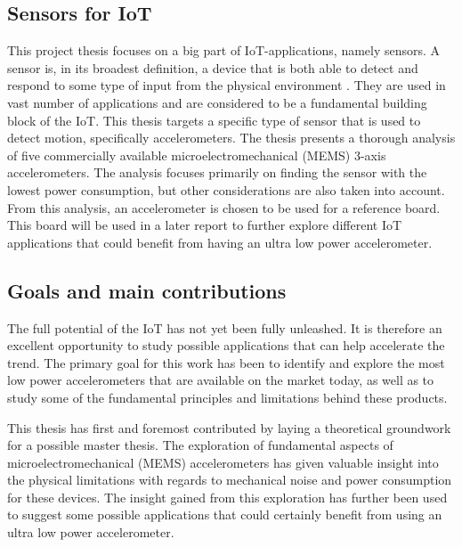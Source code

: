 \subsection{Sensors for IoT}

This project thesis focuses on a big part of IoT-applications, namely sensors. A sensor is, in its broadest definition, a device that is both able to detect and respond to some type of input from the physical environment \cite{wigmore12}. They are used in vast number of applications and are considered to be a fundamental building block of the IoT. This thesis targets a specific type of sensor that is used to detect motion, specifically accelerometers. The thesis presents a thorough analysis of five commercially available microelectromechanical (MEMS) 3-axis accelerometers. The analysis focuses primarily on finding the sensor with the lowest power consumption, but other considerations are also taken into account. From this analysis, an accelerometer is chosen to be used for a reference board. This board will be used in a later report to further explore different IoT applications that could benefit from having an ultra low power accelerometer.

\newpage

\subsection{Goals and main contributions}

The full potential of the IoT has not yet been fully unleashed. It is therefore an excellent opportunity to study possible applications that can help accelerate the trend. The primary goal for this work has been to identify and explore the most low power accelerometers that are available on the market today, as well as to study some of the fundamental principles and limitations behind these products. %

This thesis has first and foremost contributed by laying a theoretical groundwork for a possible master thesis. The exploration of fundamental aspects of microelectromechanical (MEMS) accelerometers has given valuable insight into the physical limitations with regards to mechanical noise and power consumption for these devices. The insight gained from this exploration has further been used to suggest some possible applications that could certainly benefit from using an ultra low power accelerometer. 

